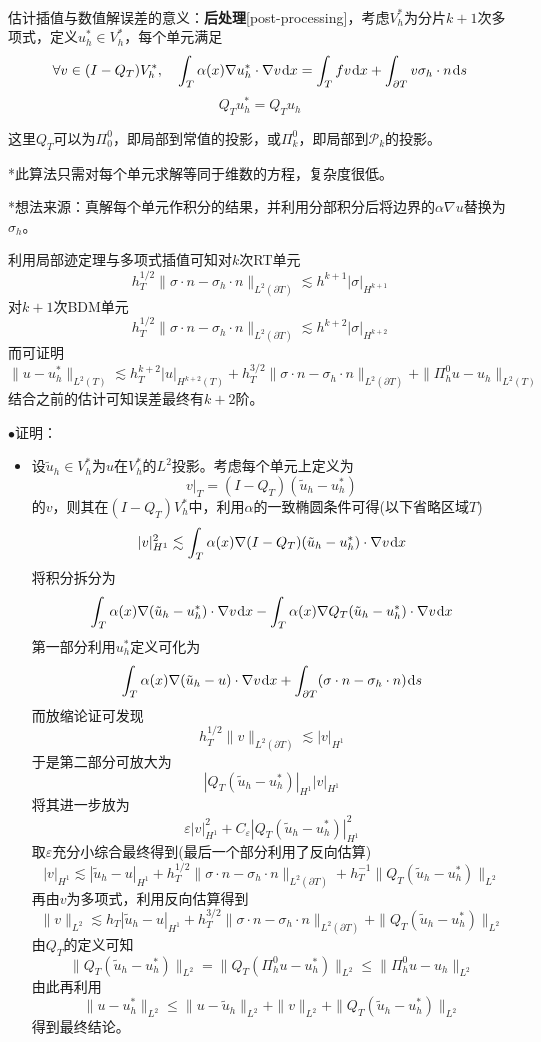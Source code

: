 \documentclass[a4paper,UTF8,fontset=windows]{ctexart}
\newcommand*{\dr}{\hspace{0.07em}\mathrm{d}}
\newcommand*{\cp}{\mathcal{P}}
\newcommand{\proo}[1]{{\kaishu $\bullet$证明：
\begin{itemize}
    \item[] #1
\end{itemize}
}}
\begin{document}
\

估计插值与数值解误差的意义：\textbf{后处理}[post-processing]，考虑$V_h^*$为分片$k+1$次多项式，定义$u_h^*\in V_h^*$，每个单元满足
$$\forall v\in(I-Q_T)V_h^*,\quad\int_T\alpha(x)\nabla u_h^*\cdot\nabla v\dr x=\int_Tfv\dr x+\int_{\partial T}v\sigma_h\cdot n\dr s$$
$$Q_Tu_h^*=Q_Tu_h$$

这里$Q_T$可以为$\Pi_0^0$，即局部到常值的投影，或$\Pi_k^0$，即局部到$\cp_k$的投影。

*此算法只需对每个单元求解等同于维数的方程，复杂度很低。

*想法来源：真解每个单元作积分的结果，并利用分部积分后将边界的$\alpha\nabla u$替换为$\sigma_h$。

利用局部迹定理与多项式插值可知对$k$次RT单元
$$h_T^{1/2}\|\sigma\cdot n-\sigma_h\cdot n\|_{L^2(\partial T)}\lesssim h^{k+1}|\sigma|_{H^{k+1}}$$
对$k+1$次BDM单元
$$h_T^{1/2}\|\sigma\cdot n-\sigma_h\cdot n\|_{L^2(\partial T)}\lesssim h^{k+2}|\sigma|_{H^{k+2}}$$
而可证明
$$\|u-u_h^*\|_{L^2(T)}\lesssim h_T^{k+2}|u|_{H^{k+2}(T)}+h_T^{3/2}\|\sigma\cdot n-\sigma_h\cdot n\|_{L^2(\partial T)}+\|\Pi_h^0u-u_h\|_{L^2(T)}$$
结合之前的估计可知误差最终有$k+2$阶。

\proo{
    设$\tilde{u}_h\in V_h^*$为$u$在$V_h^*$的$L^2$投影。考虑每个单元上定义为
    $$v\big|_T=(I-Q_T)(\tilde{u}_h-u_h^*)$$
    的$v$，则其在$(I-Q_T)V_h^*$中，利用$\alpha$的一致椭圆条件可得(以下省略区域$T$)
    $$|v|_{H^1}^2\lesssim\int_T\alpha(x)\nabla(I-Q_T)(\tilde{u}_h-u_h^*)\cdot\nabla v\dr x$$
    将积分拆分为
    $$\int_T\alpha(x)\nabla(\tilde{u}_h-u_h^*)\cdot\nabla v\dr x-\int_T\alpha(x)\nabla Q_T(\tilde{u}_h-u_h^*)\cdot\nabla v\dr x$$
    第一部分利用$u_h^*$定义可化为
    $$\int_T\alpha(x)\nabla(\tilde{u}_h-u)\cdot\nabla v\dr x+\int_{\partial T}(\sigma\cdot n-\sigma_h\cdot n)\dr s$$
    而放缩论证可发现
    $$h_T^{1/2}\|v\|_{L^2(\partial T)}\lesssim|v|_{H^1}$$
    于是第二部分可放大为
    $$|Q_T(\tilde{u}_h-u_h^*)|_{H^1}|v|_{H^1}$$
    将其进一步放为
    $$\varepsilon|v|_{H^1}^2+C_\varepsilon|Q_T(\tilde{u}_h-u_h^*)|_{H^1}^2$$
    取$\varepsilon$充分小综合最终得到(最后一个部分利用了反向估算)
    $$|v|_{H^1}\lesssim|\tilde{u}_h-u|_{H^1}+h_T^{1/2}\|\sigma\cdot n-\sigma_h\cdot n\|_{L^2(\partial T)}+h_T^{-1}\|Q_T(\tilde{u}_h-u_h^*)\|_{L^2}$$
    再由$v$为多项式，利用反向估算得到
    $$\|v\|_{L^2}\lesssim h_T|\tilde{u}_h-u|_{H^1}+h_T^{3/2}\|\sigma\cdot n-\sigma_h\cdot n\|_{L^2(\partial T)}+\|Q_T(\tilde{u}_h-u_h^*)\|_{L^2}$$
    由$Q_T$的定义可知
    $$\|Q_T(\tilde{u}_h-u_h^*)\|_{L^2}=\|Q_T(\Pi_h^0u-u_h^*)\|_{L^2}\le\|\Pi_h^0u-u_h\|_{L^2}$$
    由此再利用
    $$\|u-u_h^*\|_{L^2}\le\|u-\tilde{u}_h\|_{L^2}+\|v\|_{L^2}+\|Q_T(\tilde{u}_h-u_h^*)\|_{L^2}$$
    得到最终结论。
}
\end{document}

